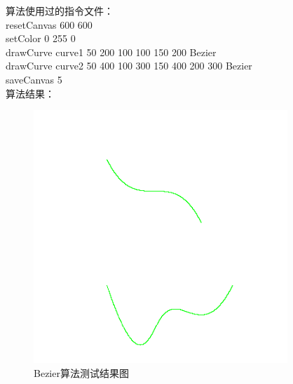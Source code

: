 \documentclass[a4paper,UTF8]{article}
\theoremstyle{definition}
\begin{document}
算法使用过的指令文件：\\

resetCanvas 600 600\\

setColor 0 255 0\\

drawCurve curve1 50 200 100 100 150 200 Bezier\\

drawCurve curve2 50 400 100 300 150 400 200 300 Bezier\\

saveCanvas 5\\

算法结果：\\
\begin{figure}[h]
	\centering
	\includegraphics[scale=0.8]{figure/bezier.png}
	\caption{Bezier算法测试结果图}
	\label{fig:bezier-result}
\end{figure}
\end{document}
